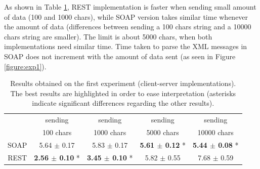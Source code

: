 \documentclass[final,1p,times]{elsarticle}
\begin{document}

As shown in Table \ref{tabla:exp1},
REST implementation is faster when sending small amount of data (100 and 1000 chars), while SOAP version takes similar time whenever the amount of data (differences between sending a 100 chars string and a 10000 chars string are smaller).
The limit is about 5000 chars, when both implementations need similar time.
Time taken to parse the XML messages in SOAP does not increment with the amount of data sent (as seen in Figure \ref{figure:exp1}).


\begin{table}[!ht]
\small{
\begin{tabular}{|c|c|c|c|c|}
\hline 
     &   sending       &  sending        &  sending     &  sending  \\
     &   100 chars     &  1000 chars     &  5000 chars  &  10000 chars  \\
\hline
SOAP & 5.64 $\pm$ 0.17 & 5.83 $\pm$ 0.17 & \textbf{5.61 $\pm$ 0.12} * & \textbf{5.44 $\pm$ 0.08} *  \\
\hline
REST & \textbf{2.56 $\pm$ 0.10} * & \textbf{3.45 $\pm$ 0.10} * & 5.82 $\pm$ 0.55 &    7.68 $\pm$ 0.59   \\
\hline
\end{tabular}
}
\caption{Results obtained on the first experiment (client-server implementations). The best results are highlighted in order to ease interpretation (asterisks indicate significant differences regarding the other results). 
\label{tabla:exp1} }
\end{table}
\end{document}
